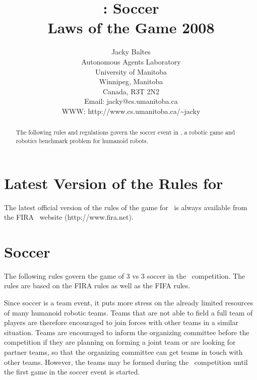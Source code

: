 \documentclass[12pt]{hurocup}
\begin{document}
\title{\HuroCup: Soccer\\
Laws of the Game 2008}

\author{Jacky Baltes\\
Autonomous Agents Laboratory\\
University of Manitoba\\
Winnipeg, Manitoba\\
Canada, R3T 2N2\\
Email: jacky@cs.umanitoba.ca\\
WWW: http://www.cs.umanitoba.ca/\~{ }jacky
}

\maketitle
\begin{abstract}
The following rules and regulations govern the soccer event in
\HuroCup, a robotic game and robotics benchmark problem for humanoid
robots.
%
\end{abstract}

\section*{Latest Version of the Rules for \HuroCup}
\label{sec:updates}

The latest official version of the rules of the game for \HuroCup\ is
always available from the FIRA \HuroCup\ website (http://www.fira.net).

\newpage

\section{Soccer}
\label{sec:soccer}

The following rules govern the game of 3 vs 3 soccer in the \HuroCup\
competition. The rules are based on the FIRA rules as well as the FIFA
rules.

Since soccer is a team event, it puts more stress on the already
limited resources of many humanoid robotic teams. Teams that are not
able to field a full team of players are therefore encouraged to join
forces with other teams in a similar situation. Teams are encouraged
to inform the organizing committee before the competition if they are
planning on forming a joint team or are looking for partner teams, so
that the organizing committee can get teams in touch with other
teams. However, the teams may be formed during the \HuroCup\
competition until the first game in the soccer event is started.
\end{document}
